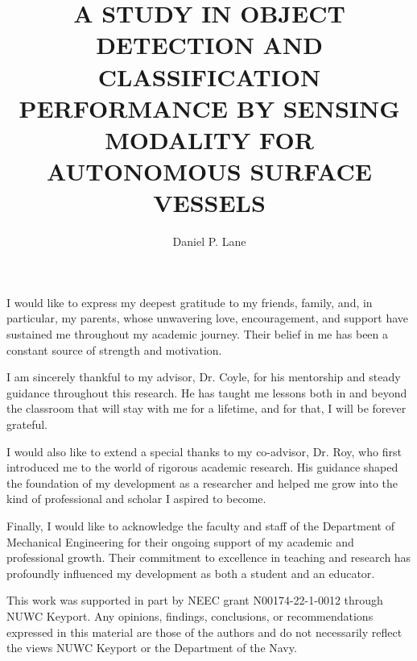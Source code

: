 \documentclass{erauthesis}
\title{A STUDY IN OBJECT DETECTION AND CLASSIFICATION
PERFORMANCE BY SENSING MODALITY FOR AUTONOMOUS
SURFACE VESSELS} %
\author{Daniel P. Lane}
\begin{document}
\frontmatter

\maketitle

\makesignature
\makeatletter 


\begin{acknowledgements}
I would like to express my deepest gratitude to my friends, family, and, in particular, my parents, whose unwavering love, encouragement, and support have sustained me throughout my academic journey. Their belief in me has been a constant source of strength and motivation.

I am sincerely thankful to my advisor, Dr. Coyle, for his mentorship and steady guidance throughout this research. He has taught me lessons both in and beyond the classroom that will stay with me for a lifetime, and for that, I will be forever grateful.

I would also like to extend a special thanks to my co-advisor, Dr. Roy, who first introduced me to the world of rigorous academic research. His guidance shaped the foundation of my development as a researcher and helped me grow into the kind of professional and scholar I aspired to become.

Finally, I would like to acknowledge the faculty and staff of the Department of Mechanical Engineering for their ongoing support of my academic and professional growth. 
Their commitment to excellence in teaching and research has profoundly influenced my development as both a student and an educator.

\vspace{3mm}

This work was supported in part by NEEC grant N00174-22-1-0012 through NUWC Keyport.
Any opinions, findings, conclusions, or recommendations expressed in this material are those of the authors and do not necessarily reflect the views NUWC Keyport or
the Department of the Navy.
\end{acknowledgements}
\end{document}
